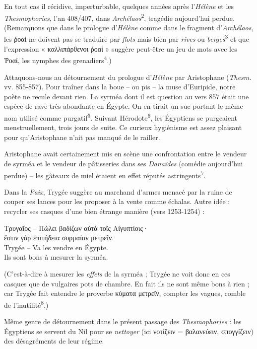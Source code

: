 \documentclass[12pt]{book}%
\newcommand{\italique}[1]{\textit{#1}}%
\newcommand{\citComm}[1]{\begin{quoting}[vskip=0pt] #1 \end{quoting}}%
\newcommand{\marqueur}[1]{\textsuperscript{#1}}%
\newenvironment{groupe}{%
\pstart%
\ledgroup%
}{%
\pend %
}%
\begin{document}
\begin{pages}
\begin{Leftside}
\begin{groupe}
{{En tout cas il récidive, imperturbable, quelques années après l'\italique{Hélène} et les \italique{Thesmophories}, l'an 408/407, dans \italique{Archélaos}\marqueur{2}, tragédie aujourd'hui perdue. (Remarquons que dans le prologue d'\italique{Hélène} comme dans le fragment d'\italique{Archélaos}, les ῥοαί ne doivent pas se traduire par \italique{flots} mais bien par \italique{rives} ou \italique{berges}\marqueur{3} et que l'expression « καλλιπάρθενοι ῥοαί » suggère peut-être un jeu de mots avec les Ῥοαί, les nymphes des grenadiers\marqueur{4}.)

Attaquons-nous au détournement du prologue d'\italique{Hélène} par Aristophane (\italique{Thesm.} vv. 855-857). Pour traîner dans la boue – ou pis – la muse d'Euripide, notre poète ne recule devant rien. La syrméa dont il est question au vers 857 était une espèce de rave très abondante en Égypte. On en tirait un suc portant le même nom utilisé comme purgatif\marqueur{5}. Suivant Hérodote\marqueur{6}, les Égyptiens se purgeaient menstruellement, trois jours de suite. Ce curieux hygiénisme est assez plaisant pour qu'Aristophane n'ait pas manqué de le railler.

Aristophane avait certainement mis en scène une confrontation entre le vendeur de syrméa et le vendeur de pâtisseries dans ses \italique{Danaïdes} (comédie aujourd'hui perdue) – les gâteaux de miel étaient en effet réputés astringents\marqueur{7}.

Dans la \italique{Paix}, Trygée suggère au marchand d'armes menacé par la ruine de couper ses lances pour les proposer à la vente comme échalas. Autre idée : recycler ses casques d'une bien étrange manière (vers 1253-1254) :
\citComm{Τρυγαῖος – Πώλει βαδίζων αὐτὰ τοῖς Αἰγυπτίοις·\\
ἔστιν γὰρ ἐπιτήδεια συρμαίαν μετρεῖν.\\
Trygée – Va les vendre en Égypte.\\
Ils sont bons à mesurer la syrméa.}%
(C'est-à-dire à mesurer les \italique{effets} de la syrméa ; Trygée ne voit donc en ces casques que de vulgaires pots de chambre. En fait ils ne sont même bons à rien ; car Trygée fait entendre le proverbe κύματα μετρεῖν, compter les vagues, comble de l'inutilité\marqueur{8}.)

Même genre de détournement dans le présent passage des \italique{Thesmophories} : les Égyptiens se servent du Nil pour se \italique{nettoyer} (ici νοτίζειν = βαλανεύειν, σπογγίζειν) des désagréments de leur régime.

}}
\end{groupe}
\end{Leftside}
\end{pages}
\end{document}
